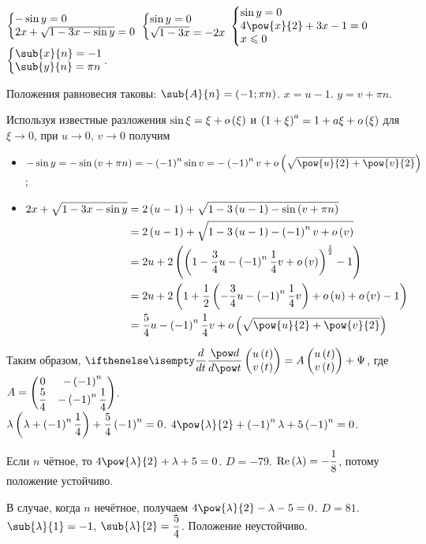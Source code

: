 \documentclass[a5paper,10pt]{article}
\begin{document}
$\tsys{-\sin y = 0 \\ 2x + \sqrt{1 - 3x - \sin y} = 0}$ 
$\tsys{\sin y = 0 \\ \sqrt{1 - 3x} = -2x}$ 
$\tsys{\sin y = 0 \\ 4\pow{x}{2} + 3x - 1 = 0 \\ x \le 0}$
$\tsys{\sub{x}{n} = -1 \\ \sub{y}{n} = \pi n}$.

Положения равновесия таковы: 
$\sub{A}{n} = \br{-1; \pi n}$.
$x = u - 1$. $y = v + \pi n$.

Используя известные разложения 
$\sin \xi = \xi + o\left(\hspace{0.01em}\xi\hspace{0.01em}\right)$ и 
$\left(\hspace{0.01em}1 + \xi\hspace{0.01em}\right)^{a} = 1 + a \xi + o\left(\hspace{0.01em}\xi\hspace{0.01em}\right)$ 
для $\xi \to 0$, при $u \to 0$, $v \to 0$ получим 
\begin{itemize}
    \item $ -\sin y
        = -\sin \br{v + \pi n} 
        = - \br{-1}^{n} \sin v 
        = - \br{-1}^{n} v + o\br{\sqrt{\pow{u}{2} + \pow{v}{2}}}$;
    \item $\begin{aligned}[t]
            2x + \sqrt{1 - 3x - \sin y} 
            & = 2\br{u - 1} + \sqrt{1 - 3 \br{u - 1} - \sin\br{v + \pi n}} \\
            & = 2 \br{u - 1} + \sqrt{1 - 3 \br{u - 1} - \br{-1}^{n} v + o\br{v}} \\
            & = 2u + 2\br{\br{1 - \dfrac {3} {4}u - \br{-1}^{n} \dfrac {1} {4} v + o\br{v}}^{\frac {1} {2}} - 1} \\
            & = 2u + 2 \br{1 
                + \dfrac {1} {2} \br{ - \dfrac {3} {4}u - \br{-1}^{n} \dfrac {1} {4} v } 
                + o\br{u} + o\br{v} - 1} \\
            & = \dfrac {5} {4} u - \br{-1}^{n} \dfrac {1} {4} v + o\br{\sqrt{\pow{u}{2} + \pow{v}{2}}}
        \end{aligned}$
\end{itemize}

Таким образом, 
$\der{}{t} \begin{pmatrix} u\br{t} \\ v\br{t} \end{pmatrix} 
    = A \begin{pmatrix} u\br{t} \\ v\br{t} \end{pmatrix} + \Psi$,
где $A = \begin{pmatrix} 0 & - \left(\hspace{0.01em}-1\hspace{0.01em}\right)^{n} 
    \\ \dfrac {5} {4} & - \left(\hspace{0.01em}-1\hspace{0.01em}\right)^{n} \dfrac {1} {4} \end{pmatrix}$. \\
$\lambda\left(\hspace{0.01em}\lambda + \left(\hspace{0.01em}-1\hspace{0.01em}\right)^{n} \dfrac {1} {4}\hspace{0.01em}\right) + \dfrac {5} {4} \left(\hspace{0.01em}-1\hspace{0.01em}\right)^{n} = 0$.
$4\pow{\lambda}{2} + \br{-1}^{n} \lambda + 5 \br{-1}^{n} = 0$.

Если $n$ чётное, то 
$4\pow{\lambda}{2} + \lambda + 5 = 0$. 
$D = -79$. 
$\operatorname{Re}\left(\hspace{0.01em}\lambda\hspace{0.01em}\right) = -\dfrac {1} {8}$, потому положение устойчиво.

В случае, когда $n$ нечётное, получаем 
$4\pow{\lambda}{2} - \lambda - 5 = 0$. 
$D = 81$. $\sub{\lambda}{1} = -1$, $\sub{\lambda}{2} = \dfrac {5} {4}$.
Положение неустойчиво.
\end{document}
